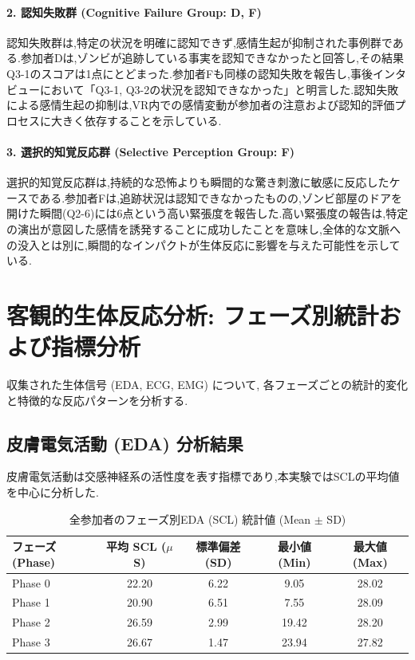 \documentclass[book,paper=a4,fontsize=10pt,jafontscale=0.92]{jlreq}
\begin{document}
\paragraph{2. 認知失敗群 (Cognitive Failure Group: D, F)}
認知失敗群は,特定の状況を明確に認知できず,感情生起が抑制された事例群である.参加者Dは,ゾンビが追跡している事実を認知できなかったと回答し,その結果Q3-1のスコアは1点にとどまった.参加者Fも同様の認知失敗を報告し,事後インタビューにおいて「Q3-1, Q3-2の状況を認知できなかった」と明言した.認知失敗による感情生起の抑制は,VR内での感情変動が参加者の注意および認知的評価プロセスに大きく依存することを示している.

\paragraph{3. 選択的知覚反応群 (Selective Perception Group: F)}
選択的知覚反応群は,持続的な恐怖よりも瞬間的な驚き刺激に敏感に反応したケースである.参加者Fは,追跡状況は認知できなかったものの,ゾンビ部屋のドアを開けた瞬間(Q2-6)には6点という高い緊張度を報告した.高い緊張度の報告は,特定の演出が意図した感情を誘発することに成功したことを意味し,全体的な文脈への没入とは別に,瞬間的なインパクトが生体反応に影響を与えた可能性を示している.


\section{客観的生体反応分析: フェーズ別統計および指標分析}
収集された生体信号 (EDA, ECG, EMG) について, 各フェーズごとの統計的変化と特徴的な反応パターンを分析する.

\subsection{皮膚電気活動 (EDA) 分析結果}
皮膚電気活動は交感神経系の活性度を表す指標であり,本実験ではSCLの平均値を中心に分析した.

\begin{table}[t]
\centering
\caption{全参加者のフェーズ別EDA (SCL) 統計値 (Mean $\pm$ SD)}
\label{tab:eda_scl_stats}
\begin{tabular}{lcccc}
\hline
フェーズ (Phase) & 平均 SCL ($\mu$S) & 標準偏差 (SD) & 最小値 (Min) & 最大値 (Max) \\
\hline
Phase 0 & 22.20 & 6.22 & 9.05 & 28.02 \\
Phase 1  & 20.90 & 6.51 & 7.55 & 28.09 \\
Phase 2  & 26.59 & 2.99 & 19.42 & 28.20 \\
Phase 3  & 26.67 & 1.47 & 23.94 & 27.82 \\
\hline
\end{tabular}
\end{table}
\end{document}
